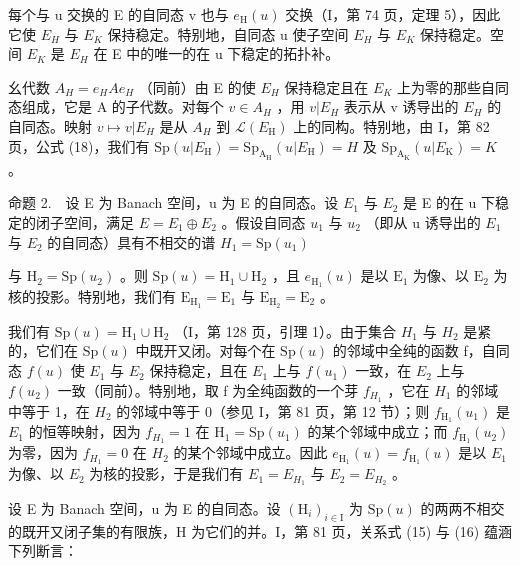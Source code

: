 每个与 u 交换的 E 的自同态 v 也与 \(e_{\mathrm{H}}(u)\) 交换（I，第 74 页，定理 5），因此它使 \(E_{H}\) 与 \(E_{K}\) 保持稳定。特别地，自同态 u 使子空间 \(E_{H}\) 与 \(E_{K}\) 保持稳定。空间 \(E_{K}\) 是 \(E_{H}\) 在 E 中的唯一的在 u 下稳定的拓扑补。

幺代数 \(A_{H} = e_{H}Ae_{H}\) （同前）由 E 的使 \(E_{H}\) 保持稳定且在 \(E_{K}\) 上为零的那些自同态组成，它是 A 的子代数。对每个 \(v \in A_{H}\) ，用 \(v|E_{H}\) 表示从 v 诱导出的 \(E_{H}\) 的自同态。映射 \(v \mapsto v|E_{H}\) 是从 \(A_{H}\) 到 \(\mathcal{L}(E_{\mathrm{H}})\) 上的同构。特别地，由 I，第 82 页，公式 (18)，我们有 \(\mathrm{Sp}(u|E_{\mathrm{H}}) = \mathrm{Sp}_{\mathrm{A}_{\mathrm{H}}} (u|E_{\mathrm{H}}) = H\) 及 \(\mathrm{Sp}_{\mathrm{A}_{\mathrm{K}}} (u|E_{\mathrm{K}}) = K\) 。

命题 2.　设 E 为 Banach 空间，u 为 E 的自同态。设 \(E_{1}\) 与 \(E_{2}\) 是 E 的在 u 下稳定的闭子空间，满足 \(E = E_{1} \oplus E_{2}\) 。假设自同态 \(u_{1}\) 与 \(u_{2}\) （即从 u 诱导出的 \(E_{1}\) 与 \(E_{2}\) 的自同态）具有不相交的谱 \(H_{1} = \mathrm{Sp}(u_{1})\)

与 \(\mathrm{H}_2 = \mathrm{Sp}(u_2)\) 。则 \(\mathrm{Sp}(u) = \mathrm{H}_1 \cup \mathrm{H}_2\) ，且 \(e_{\mathrm{H}_1}(u)\) 是以 \(\mathrm{E}_1\) 为像、以 \(\mathrm{E}_2\) 为核的投影。特别地，我们有 \(\mathrm{E}_{\mathrm{H}_1} = \mathrm{E}_1\) 与 \(\mathrm{E}_{\mathrm{H}_2} = \mathrm{E}_2\) 。

我们有 \(\mathrm{Sp}(u)=\mathrm{H}_{1}\cup\mathrm{H}_{2}\) （I，第 128 页，引理 1）。由于集合 \(H_{1}\) 与 \(H_{2}\) 是紧的，它们在 \(\mathrm{Sp}(u)\) 中既开又闭。对每个在 \(\mathrm{Sp}(u)\) 的邻域中全纯的函数 f，自同态 \(f(u)\) 使 \(E_{1}\) 与 \(E_{2}\) 保持稳定，且在 \(E_{1}\) 上与 \(f(u_{1})\) 一致，在 \(E_{2}\) 上与 \(f(u_{2})\) 一致（同前）。特别地，取 f 为全纯函数的一个芽 \(f_{H_{1}}\) ，它在 \(H_{1}\) 的邻域中等于 1，在 \(H_{2}\) 的邻域中等于 0（参见 I，第 81 页，第 12 节）；则 \(f_{\mathrm{H}_{1}}(u_{1})\) 是 \(E_{1}\) 的恒等映射，因为 \(f_{H_{1}}=1\) 在 \(\mathrm{H}_{1}=\mathrm{Sp}(u_{1})\) 的某个邻域中成立；而 \(f_{\mathrm{H}_{1}}(u_{2})\) 为零，因为 \(f_{H_{1}}=0\) 在 \(H_{2}\) 的某个邻域中成立。因此 \(e_{\mathrm{H}_{1}}(u)=f_{\mathrm{H}_{1}}(u)\) 是以 \(E_{1}\) 为像、以 \(E_{2}\) 为核的投影，于是我们有 \(E_{1}=E_{H_{1}}\) 与 \(E_{2}=E_{H_{2}}\) 。

设 E 为 Banach 空间，u 为 E 的自同态。设 \((\mathrm{H}_{i})_{i\in\mathrm{I}}\) 为 \(\mathrm{Sp}(u)\) 的两两不相交的既开又闭子集的有限族，H 为它们的并。I，第 81 页，关系式 (15) 与 (16) 蕴涵下列断言：

